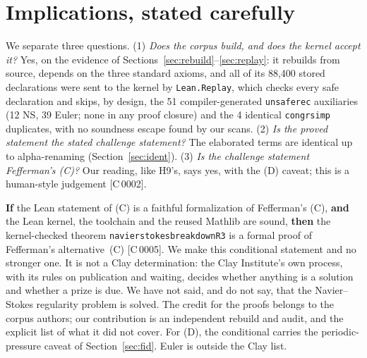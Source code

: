 \documentclass[10pt]{article}
\newcommand{\tg}[2]{\texorpdfstring{\textsf{[#1\,#2]}}{}}  %
\newcommand{\lean}[1]{\texttt{#1}}
\renewcommand{\_}{\textunderscore\allowbreak}
\begin{document}
\section{Implications, stated carefully}\label{sec:impl}
We separate three questions. (1) \emph{Does the corpus build, and does the kernel accept it?} Yes, on the evidence of Sections~\ref{sec:rebuild}--\ref{sec:replay}: it rebuilds from source, depends on the three standard axioms, and all of its 88,400 stored declarations were sent to the kernel by \lean{Lean.Replay}, which checks every safe declaration and skips, by design, the 51 compiler-generated \lean{\_unsafe\_rec} auxiliaries (12 NS, 39 Euler; none in any proof closure) and the 4 identical \lean{congr\_simp} duplicates, with no soundness escape found by our scans.
(2) \emph{Is the proved statement the stated challenge statement?} The elaborated terms are identical up to alpha-renaming (Section~\ref{sec:ident}). (3) \emph{Is the challenge statement Fefferman's (C)?} Our reading, like H9's, says yes, with the (D) caveat; this is a human-style judgement \tg{C}{0002}.

\textbf{If} the Lean statement of (C) is a faithful formalization of Fefferman's (C), \textbf{and} the Lean kernel, the toolchain and the reused Mathlib are sound, \textbf{then} the kernel-checked theorem \lean{navier\_stokes\_breakdown\_R3} is a formal proof of Fefferman's alternative~(C) \tg{C}{0005}.
We make this conditional statement and no stronger one. It is not a Clay determination: the Clay Institute's own process, with its rules on publication and waiting, decides whether anything is a solution and whether a prize is due. We have not said, and do not say, that the Navier--Stokes regularity problem is solved. The credit for the proofs belongs to the corpus authors; our contribution is an independent rebuild and audit, and the explicit list of what it did not cover.
For (D), the conditional carries the periodic-pressure caveat of Section~\ref{sec:fid}. Euler is outside the Clay list.
\end{document}
